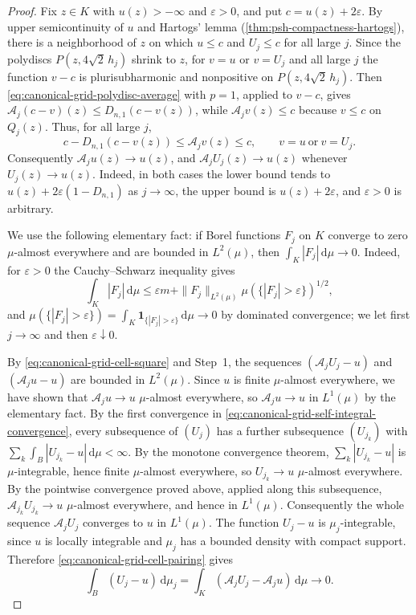 \begin{proof}
Fix $z\in K$ with $u(z)>-\infty$ and $\varepsilon>0$, and put $c=u(z)+2\varepsilon$. By upper semicontinuity of $u$ and Hartogs' lemma (\cref{thm:psh-compactness-hartogs}), there is a neighborhood of $z$ on which $u\le c$ and $U_j\le c$ for all large $j$. Since the polydiscs $P(z,4\sqrt2\,h_j)$ shrink to $z$, for $v=u$ or $v=U_j$ and all large $j$ the function $v-c$ is plurisubharmonic and nonpositive on $P(z,4\sqrt2\,h_j)$. Then \eqref{eq:canonical-grid-polydisc-average} with $p=1$, applied to $v-c$, gives $\mathcal A_j(c-v)(z)\le D_{n,1}(c-v(z))$, while $\mathcal A_jv(z)\le c$ because $v\le c$ on $Q_j(z)$. Thus, for all large $j$,
\[
 c-D_{n,1}(c-v(z))\leq\mathcal A_jv(z)\leq c,
                   \qquad v=u\ \text{or}\ v=U_j.
\]
Consequently $\mathcal A_ju(z)\to u(z)$, and $\mathcal A_jU_j(z)\to u(z)$ whenever $U_j(z)\to u(z)$. Indeed, in both cases the lower bound tends to $u(z)+2\varepsilon(1-D_{n,1})$ as $j\to\infty$, the upper bound is $u(z)+2\varepsilon$, and $\varepsilon>0$ is arbitrary.

We use the following elementary fact: if Borel functions $F_j$ on $K$ converge to zero $\mu$-almost everywhere and are bounded in $L^2(\mu)$, then $\int_K|F_j|\,\mathrm d\mu\to0$. Indeed, for $\varepsilon>0$ the Cauchy--Schwarz inequality gives
\[
 \int_K|F_j|\,\mathrm d\mu
 \leq\varepsilon m+\|F_j\|_{L^2(\mu)}
                 \mu(\{|F_j|>\varepsilon\})^{1/2},
\]
and $\mu(\{|F_j|>\varepsilon\})=\int_K\mathbf1_{\{|F_j|>\varepsilon\}}\,\mathrm d\mu\to0$ by dominated convergence; we let first $j\to\infty$ and then $\varepsilon\downarrow0$.

By \eqref{eq:canonical-grid-cell-square} and Step~1, the sequences $(\mathcal A_jU_j-u)$ and $(\mathcal A_ju-u)$ are bounded in $L^2(\mu)$. Since $u$ is finite $\mu$-almost everywhere, we have shown that $\mathcal A_ju\to u$ $\mu$-almost everywhere, so $\mathcal A_ju\to u$ in $L^1(\mu)$ by the elementary fact. By the first convergence in \eqref{eq:canonical-grid-self-integral-convergence}, every subsequence of $(U_j)$ has a further subsequence $(U_{j_k})$ with $\sum_k\int_B|U_{j_k}-u|\,\mathrm d\mu<\infty$. By the monotone convergence theorem, $\sum_k|U_{j_k}-u|$ is $\mu$-integrable, hence finite $\mu$-almost everywhere, so $U_{j_k}\to u$ $\mu$-almost everywhere. By the pointwise convergence proved above, applied along this subsequence, $\mathcal A_{j_k}U_{j_k}\to u$ $\mu$-almost everywhere, and hence in $L^1(\mu)$. Consequently the whole sequence $\mathcal A_jU_j$ converges to $u$ in $L^1(\mu)$. The function $U_j-u$ is $\mu_j$-integrable, since $u$ is locally integrable and $\mu_j$ has a bounded density with compact support. Therefore \eqref{eq:canonical-grid-cell-pairing} gives
\begin{equation}\label{eq:canonical-grid-signed-integral}
 \int_B(U_j-u)\,\mathrm d\mu_j=\int_K(\mathcal A_jU_j-\mathcal A_ju)\,\mathrm d\mu\longrightarrow0.
\end{equation}


\end{proof}
